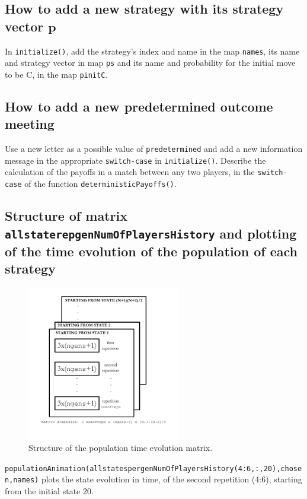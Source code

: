 \documentclass[12pt]{report}
\begin{document}
\subsection{How to add a new strategy with its strategy vector $\mathbf{p}$}

In \texttt{initialize()}, add the strategy's index and name in the map \texttt{names}, its name and strategy vector in map \texttt{ps} and its name and probability for the initial move to be C, in the map \texttt{pinitC}.

\subsection{How to add a new predetermined outcome meeting}

Use a new letter as a possible value of \texttt{predetermined} and add a new information message in the appropriate \texttt{switch-case} in \texttt{initialize()}. Describe the calculation of the payoffs in a match between any two players, in the \texttt{switch-case} of the function \texttt{deterministicPayoffs()}.

\clearpage
\subsection{Structure of matrix \texttt{allstaterepgenNumOfPlayersHistory} and plotting of the time evolution of the population of each strategy}

\begin{figure}[h!]
    \centering
    \includegraphics[width=0.6\textwidth]{Matrix Structure.pdf}
    \caption{Structure of the population time evolution matrix.}
\end{figure}
\texttt{populationAnimation(allstatespergenNumOfPlayersHistory(4:6,:,20),chosen,names)} plots the state evolution in time, of the second repetition (4:6), starting from the initial state 20.
\end{document}
